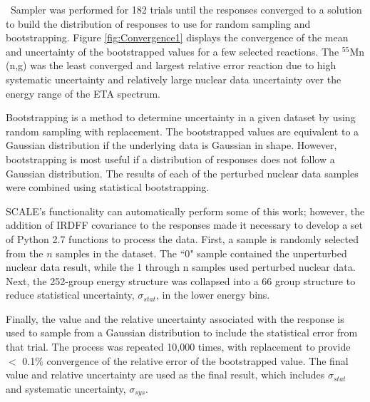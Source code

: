 
\ Sampler was performed for 182 trials until the responses converged to a solution to build the distribution of responses to use for random sampling and bootstrapping. 
Figure \ref{fig:Convergence1} displays the convergence of the mean and uncertainty of the bootstrapped values for a few selected reactions. 
The $\mathrm{^{55}}$Mn (n,g) was the least converged and largest relative error reaction due to high systematic uncertainty and relatively large nuclear data uncertainty over the energy range of the ETA spectrum. 

Bootstrapping is a method to determine uncertainty in a given dataset by using random sampling with replacement.
The bootstrapped values are equivalent to a Gaussian distribution if the underlying data is Gaussian in shape. 
However, bootstrapping is most useful if a distribution of responses does not follow a Gaussian distribution.
The results of each of the perturbed nuclear data samples were combined using statistical bootstrapping.

SCALE's functionality can automatically perform some of this work; however, the addition of IRDFF covariance to the responses made it necessary to develop a set of Python 2.7 functions to process the data. 
First, a sample is randomly selected from the $n$ samples in the dataset. 
The ``0" sample contained the unperturbed nuclear data result, while the 1 through n samples used perturbed nuclear data. 
Next, the 252-group energy structure was collapsed into a 66 group structure to reduce statistical uncertainty, $\sigma_{stat}$, in the lower energy bins.  

Finally, the value and the relative uncertainty associated with the response is used to sample from a Gaussian distribution to include the statistical error from that trial. 
The process was repeated 10,000 times, with replacement to provide $<$ 0.1\% convergence of the relative error of the bootstrapped value. 
The final value and relative uncertainty are used as the final result, which includes $\sigma_{stat}$ and systematic uncertainty, $\sigma_{sys}$.

